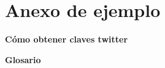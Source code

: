 \chapter{Anexo de ejemplo}
\label{apendice:anexo1}

\textbf{Cómo obtener claves twitter}

\textbf{Glosario}

